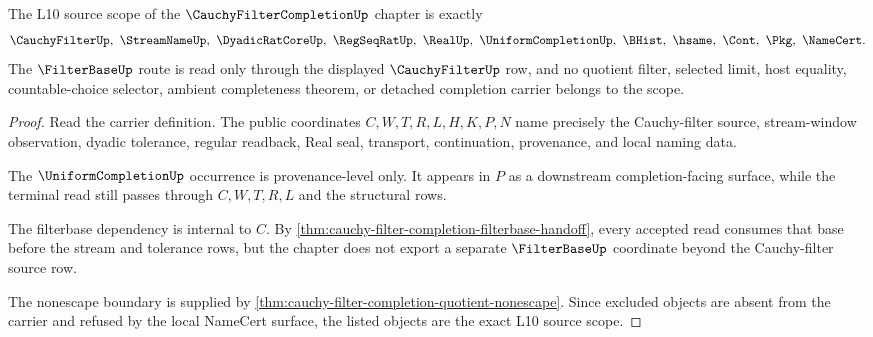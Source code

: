 \begin{theorem}
\label{thm:cauchy-filter-completion-l10-source-scope}
The L10 source scope of the $\CauchyFilterCompletionUp$ chapter is exactly
$$
\CauchyFilterUp,\ \StreamNameUp,\ \DyadicRatCoreUp,\ \RegSeqRatUp,\ \RealUp,\ \UniformCompletionUp,\ \BHist,\ \hsame,\ \Cont,\ \Pkg,\ \NameCert .
$$
The $\FilterBaseUp$ route is read only through the displayed $\CauchyFilterUp$ row, and no quotient filter, selected limit, host equality, countable-choice selector, ambient completeness theorem, or detached completion carrier belongs to the scope.
\end{theorem}
\begin{proof}
Read the carrier definition. The public coordinates $C,W,T,R,L,H,K,P,N$ name precisely the Cauchy-filter source, stream-window observation, dyadic tolerance, regular readback, Real seal, transport, continuation, provenance, and local naming data.

The $\UniformCompletionUp$ occurrence is provenance-level only. It appears in $P$ as a downstream completion-facing surface, while the terminal read still passes through $C,W,T,R,L$ and the structural rows.

The filterbase dependency is internal to $C$. By \autoref{thm:cauchy-filter-completion-filterbase-handoff}, every accepted read consumes that base before the stream and tolerance rows, but the chapter does not export a separate $\FilterBaseUp$ coordinate beyond the Cauchy-filter source row.

The nonescape boundary is supplied by \autoref{thm:cauchy-filter-completion-quotient-nonescape}. Since excluded objects are absent from the carrier and refused by the local NameCert surface, the listed objects are the exact L10 source scope.
\end{proof}

